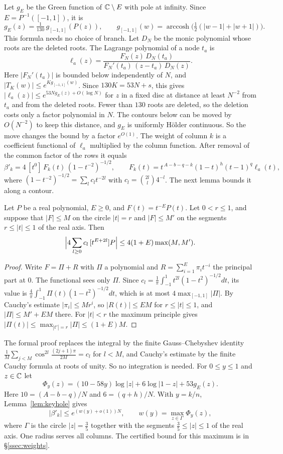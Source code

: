 Let $g_E$ be the Green function of $\mathbb C\setminus E$ with pole at infinity. Since $E=P^{-1}([-1,1])$, it is
\[
 g_E(z)=\tfrac1{130}\,g_{[-1,1]}(P(z)),\qquad
 g_{[-1,1]}(w)=\operatorname{arccosh}\bigl(\tfrac12(|w-1|+|w+1|)\bigr).
\]
This formula needs no choice of branch. Let $D_N$ be the monic polynomial whose roots are the deleted roots.
The Lagrange polynomial of a node $t_a$ is
\[
 \ell_a(z)=\frac{F_N(z)\,D_N(t_a)}{F_N'(t_a)\,(z-t_a)\,D_N(z)}.
\]
Here $|F_N'(t_a)|$ is bounded below independently of $N$, and $|T_K(w)|\le e^{Kg_{[-1,1]}(w)}$. Since $130K=53N+s$, this gives $|\ell_a(z)|\le e^{53Ng_E(z)+O(\log N)}$ for $z$ in
a fixed disc at distance at least $N^{-2}$ from $t_a$ and from the deleted roots. Fewer than $130$ roots
are deleted, so the deletion costs only a factor polynomial in $N$. The contours below can be moved by
$O(N^{-2})$ to keep this distance, and $g_E$ is uniformly H\"older continuous. So the move changes the
bound by a factor $e^{O(1)}$. The weight of column $k$ is a
coefficient functional of $\ell_a$ multiplied by the column function. After removal of the common factor of
the rows it equals
\[
 \beta'_k=4\,[t^0]\,F_k(t)\,(1-t^{-2})^{-1/2},\qquad F_k(t)=t^{\,A-b-q-k}(1-t)^h(t-1)^q\ell_a(t),
\]
where $(1-t^{-2})^{-1/2}=\sum_lc_lt^{-2l}$ with $c_l=\binom{2l}l4^{-l}$. The next lemma bounds it along a contour.

\begin{lemma}\label{lem:keyhole}
Let $P$ be a real polynomial, $E\ge0$, and $F(t)=t^{-E}P(t)$. Let $0<r\le1$, and suppose that $|F|\le M$ on
the circle $|t|=r$ and $|F|\le M'$ on the segments $r\le|t|\le1$ of the real axis. Then
\[
 \Bigl|4\sum_{l\ge0}c_l\,[t^{E+2l}]P\Bigr|\le4(1+E)\max(M,M').
\]
\end{lemma}

\begin{proof}
Write $F=\Pi+R$ with $\Pi$ a polynomial and $R=\sum_{i=1}^E\pi_it^{-i}$ the principal part at $0$. The
functional sees only $\Pi$. Since $c_l=\frac1\pi\int_{-1}^1t^{2l}(1-t^2)^{-1/2}dt$, its value is
$\frac4\pi\int_{-1}^1\Pi(t)(1-t^2)^{-1/2}dt$, which is at most $4\max_{[-1,1]}|\Pi|$. By Cauchy's estimate
$|\pi_i|\le Mr^i$, so $|R(t)|\le EM$ for $r\le|t|\le1$, and $|\Pi|\le M'+EM$ there. For $|t|<r$ the maximum
principle gives $|\Pi(t)|\le\max_{|t'|=r}|\Pi|\le(1+E)M$.
\end{proof}

The formal proof replaces the integral by the finite Gauss--Chebyshev identity
$\frac1M\sum_{j<M}\cos^{2l}\frac{(2j+1)\pi}{2M}=c_l$ for $l<M$, and Cauchy's estimate by the finite Cauchy formula
at roots of unity. So no integration is needed. For $0\le y\le1$ and $z\in\mathbb C$ let
\[
 \Phi_y(z)=(10-58y)\log|z|+6\log|1-z|+53g_E(z).
\]
Here $10=(A-b-q)/N$ and $6=(q+h)/N$. With $y=k/n$, Lemma~\ref{lem:keyhole} gives
\begin{equation}\label{eq:wk}
 |\beta'_k|\le e^{(w(y)+o(1))N},\qquad w(y)=\max_{z\in\Gamma}\Phi_y(z),
\end{equation}
where $\Gamma$ is the circle $|z|=\frac35$ together with the segments $\frac35\le|z|\le1$ of the real axis. One
radius serves all columns. The certified bound for this maximum is in \S\ref{ssec:weights}.

